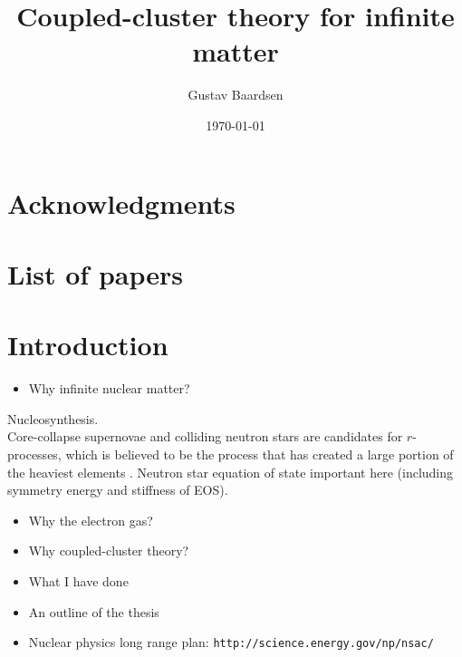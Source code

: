 \documentclass[a4paper,12pt]{report}
\begin{document}


\title{Coupled-cluster theory for infinite matter}

\author{Gustav Baardsen}
\date{\today }

\maketitle

\chapter*{Acknowledgments}

\chapter*{List of papers}

\tableofcontents

\chapter{Introduction}

\begin{itemize}
\item Why infinite nuclear matter?
\end{itemize}
Nucleosynthesis. \\
Core-collapse supernovae and colliding neutron stars are 
candidates for $r$-processes,
which is believed to be the process that has created a 
large portion of the heaviest elements 
\cite{arnould_2007,goriely_2012}. Neutron star
equation of state important here (including symmetry 
energy and stiffness of EOS). \cite{janka_2012} \\


\begin{itemize}
\item Why the electron gas?
\item Why coupled-cluster theory?
\item What I have done
\item An outline of the thesis
\item Nuclear physics long range plan: \verb+http://science.energy.gov/np/nsac/+
\end{itemize}
\end{document}
